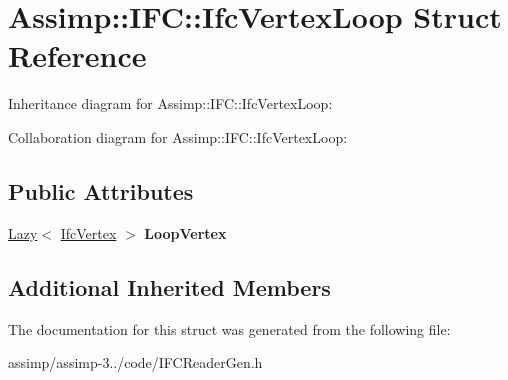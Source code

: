 \hypertarget{struct_assimp_1_1_i_f_c_1_1_ifc_vertex_loop}{\section{Assimp\+:\+:I\+F\+C\+:\+:Ifc\+Vertex\+Loop Struct Reference}
\label{struct_assimp_1_1_i_f_c_1_1_ifc_vertex_loop}
}


Inheritance diagram for Assimp\+:\+:I\+F\+C\+:\+:Ifc\+Vertex\+Loop\+:


Collaboration diagram for Assimp\+:\+:I\+F\+C\+:\+:Ifc\+Vertex\+Loop\+:
\subsection*{Public Attributes}
\begin{DoxyCompactItemize}
\item 
\hypertarget{struct_assimp_1_1_i_f_c_1_1_ifc_vertex_loop_af9b95d5c81c627b305a4eb1f7352e357}{\hyperlink{struct_assimp_1_1_s_t_e_p_1_1_lazy}{Lazy}$<$ \hyperlink{struct_assimp_1_1_i_f_c_1_1_ifc_vertex}{Ifc\+Vertex} $>$ {\bfseries Loop\+Vertex}}\label{struct_assimp_1_1_i_f_c_1_1_ifc_vertex_loop_af9b95d5c81c627b305a4eb1f7352e357}

\end{DoxyCompactItemize}
\subsection*{Additional Inherited Members}


The documentation for this struct was generated from the following file\+:\begin{DoxyCompactItemize}
\item 
assimp/assimp-\/3../code/I\+F\+C\+Reader\+Gen.\+h\end{DoxyCompactItemize}
